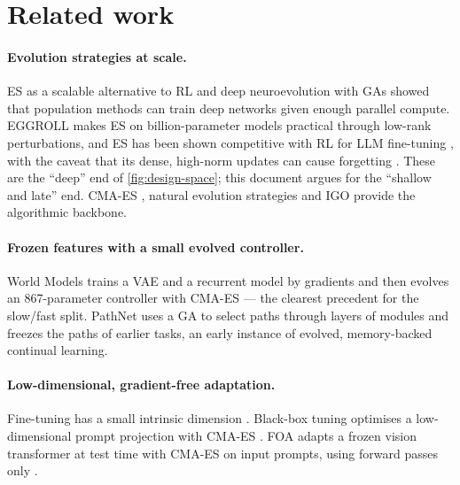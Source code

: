 \documentclass[11pt,a4paper]{article}
\theoremstyle{definition}
\theoremstyle{plain}
\theoremstyle{remark}
\begin{document}
\section{Related work}
\label{sec:related}

\paragraph{Evolution strategies at scale.}
ES as a scalable alternative to RL \cite{salimans2017es} and deep neuroevolution with GAs \cite{such2017deep} showed that population methods can train deep networks given enough parallel compute. EGGROLL \cite{eggroll} makes ES on billion-parameter models practical through low-rank perturbations, and ES has been shown competitive with RL for LLM fine-tuning \cite{qiu2025esscale}, with the caveat that its dense, high-norm updates can cause forgetting \cite{esforgetting}. These are the ``deep'' end of \cref{fig:design-space}; this document argues for the ``shallow and late'' end. CMA-ES \cite{hansen2016cma}, natural evolution strategies \cite{wierstra2014nes} and IGO \cite{ollivier2017igo} provide the algorithmic backbone.

\paragraph{Frozen features with a small evolved controller.}
World Models \cite{ha2018world} trains a VAE and a recurrent model by gradients and then evolves an 867-parameter controller with CMA-ES --- the clearest precedent for the slow/fast split. PathNet \cite{fernando2017pathnet} uses a GA to select paths through layers of modules and freezes the paths of earlier tasks, an early instance of evolved, memory-backed continual learning.

\paragraph{Low-dimensional, gradient-free adaptation.}
Fine-tuning has a small intrinsic dimension \cite{li2018intrinsic,aghajanyan2021intrinsic}. Black-box tuning optimises a low-dimensional prompt projection with CMA-ES \cite{sun2022bbt}. FOA adapts a frozen vision transformer at test time with CMA-ES on input prompts, using forward passes only \cite{niu2024foa}.
\end{document}
